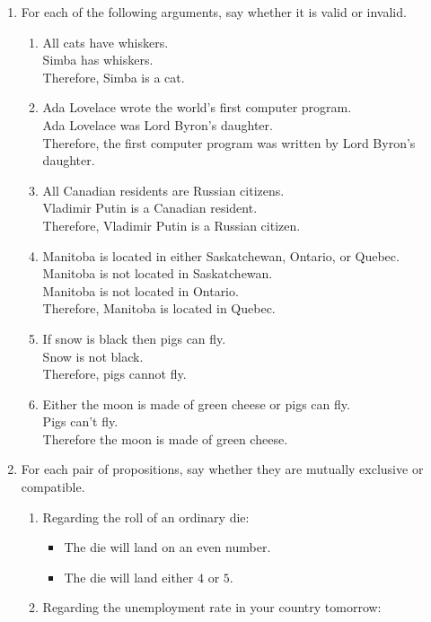 \documentclass[justified]{tufte-book}
\providecommand{\tightlist}{%
  \setlength{\itemsep}{0pt}\setlength{\parskip}{0pt}}
\theoremstyle{definition}
\theoremstyle{definition}
\theoremstyle{definition}
\theoremstyle{definition}
\theoremstyle{remark}
\begin{document}
\begin{enumerate}
\item
  For each of the following arguments, say whether it is valid or invalid.

  \begin{enumerate}
  \def\labelenumii{\alph{enumii}.}
  \item
    All cats have whiskers.\\
    Simba has whiskers.\\
    Therefore, Simba is a cat.
  \item
    Ada Lovelace wrote the world's first computer program.\\
    Ada Lovelace was Lord Byron's daughter.\\
    Therefore, the first computer program was written by Lord Byron's daughter.
  \item
    All Canadian residents are Russian citizens.\\
    Vladimir Putin is a Canadian resident.\\
    Therefore, Vladimir Putin is a Russian citizen.
  \item
    Manitoba is located in either Saskatchewan, Ontario, or Quebec.\\
    Manitoba is not located in Saskatchewan.\\
    Manitoba is not located in Ontario.\\
    Therefore, Manitoba is located in Quebec.
  \item
    If snow is black then pigs can fly.\\
    Snow is not black.\\
    Therefore, pigs cannot fly.
  \item
    Either the moon is made of green cheese or pigs can fly.\\
    Pigs can't fly.\\
    Therefore the moon is made of green cheese.\\
  \end{enumerate}
\item
  For each pair of propositions, say whether they are mutually exclusive or compatible.

  \begin{enumerate}
  \def\labelenumii{\alph{enumii}.}
  \item
    Regarding the roll of an ordinary die:

    \begin{itemize}
    \tightlist
    \item
      The die will land on an even number.
    \item
      The die will land either \(4\) or \(5\).
    \end{itemize}
  \item
    Regarding the unemployment rate in your country tomorrow:


\end{enumerate}
\end{enumerate}
\end{document}
